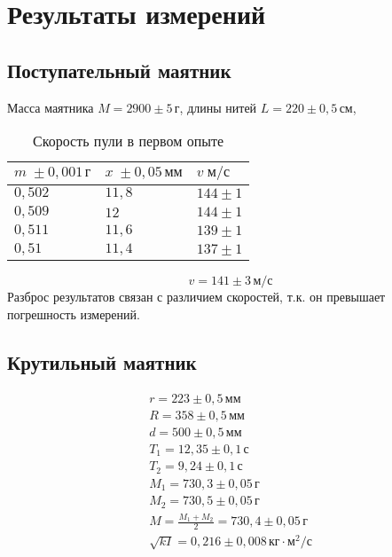 \section{Результаты измерений}

\subsection{Поступательный маятник}

Масса маятника $M=2900\pm 5\,\text{г}$, длины нитей $L=220\pm 0{,}5\,\text{см}$,

\begin{table}[!ht]
    \caption{Скорость пули в первом опыте}
    \begin{tabular}{|l|l|l|}
    \hline
    $m\;\pm 0{,}001\,\text{г}$ & $x\;\pm 0{,}05\,\text{мм}$ & $v\;\text{м}/\text{с}$ \\ \hline
    $0{,}502$                  & $11{,}8$                   & $144\pm 1$             \\ \hline
    $0{,}509$                  & $12$                       & $144\pm 1$             \\ \hline
    $0{,}511$                  & $11{,}6$                   & $139\pm 1$             \\ \hline
    $0{,}51$                   & $11{,}4$                   & $137\pm 1$             \\ \hline
    \end{tabular}
\end{table}

\[v=141\pm 3\,\text{м}/\text{с}\]
Разброс результатов связан с различием скоростей, т.к. он превышает погрешность измерений.

\subsection{Крутильный маятник}

\begin{gather*}
    r=223\pm 0{,}5\,\text{мм}\\
    R=358\pm 0{,}5\,\text{мм}\\
    d=500\pm 0{,}5\,\text{мм}\\
    T_1=12{,}35\pm 0{,}1\,\text{с}\\
    T_2=9{,}24\pm 0{,}1\,\text{с}\\
    M_1=730{,}3\pm 0{,}05\,\text{г}\\
    M_2=730{,}5\pm 0{,}05\,\text{г}\\
    M=\frac{M_1+M_2}{2}=730{,}4\pm 0{,}05\,\text{г}\\
    \sqrt{kI}=0{,}216\pm 0{,}008\,\text{кг}\cdot\text{м}^2/\text{с}
\end{gather*}

